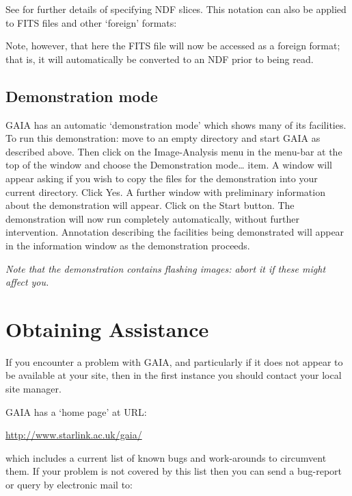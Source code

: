 \documentclass[twoside,11pt]{starlink}
\begin{document}
See \cite{SUN33} for further details of specifying
NDF slices.  This notation can also be applied to FITS files and other
`foreign' formats:

\begin{terminalv}
\end{terminalv}

Note, however, that here the FITS file will now be accessed as a foreign
format; that is, it will automatically be converted to an NDF prior to
being read.

\subsection{Demonstration mode}

GAIA has an automatic `demonstration mode' which shows many of its
facilities.  To run this demonstration: move to an empty directory and
start GAIA as described above.  Then click on the \textsf{Image-Analysis} menu
in the menu-bar at the top of the window and choose the \textsf{Demonstration
mode\ldots} item.  A window will appear asking if you wish to copy the
files for the demonstration into your current directory.  Click \textsf{Yes}.  A further window with preliminary information about the demonstration
will appear.  Click on the \textsf{Start} button.  The demonstration will now
run completely automatically, without further intervention.  Annotation
describing the facilities being demonstrated will appear in the
information window as the demonstration proceeds.

\emph{Note that the demonstration contains flashing images: abort it if
these might affect you.}


\section{\label{ASSIST}Obtaining  Assistance}

If you encounter a problem with GAIA, and particularly if it does not appear
to be available at your site, then in the first instance you should contact
your local site manager.

GAIA has a `home page' at URL:

\begin{center}
\url{http://www.starlink.ac.uk/gaia/}
\end{center}

which includes a current list of known bugs and work-arounds to circumvent
them.  If your problem is not covered by this list then you can send a
bug-report or query by electronic mail to:
\end{document}

